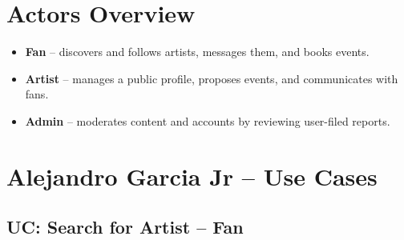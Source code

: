 \documentclass[11pt]{report}
\newcommand{\fillin}[1]{\textcolor{gray!70}{\emph{[#1]}}}
\begin{document}
\section*{Actors Overview}
\begin{itemize}
  \item \textbf{Fan} -- discovers and follows artists, messages them, and books events.
  \item \textbf{Artist} -- manages a public profile, proposes events, and communicates with fans.
  \item \textbf{Admin} -- moderates content and accounts by reviewing user-filed reports.
\end{itemize}

\section{{Alejandro Garcia Jr} -- Use Cases}

\subsection{UC: Search for Artist -- Fan}
\end{document}
